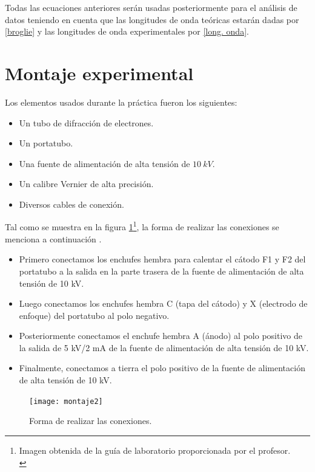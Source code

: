 \documentclass[prb,aps,twocolumn,preprintnumbers,amsmath,amssymb]{revtex4}
\begin{document}
Todas las ecuaciones anteriores serán usadas posteriormente para el análisis de datos teniendo en cuenta que las longitudes de onda teóricas estarán dadas por \eqref{broglie} y las longitudes de onda experimentales por \eqref{long. onda}. 

\section{Montaje experimental}

Los elementos usados durante la práctica fueron los siguientes:

\begin{itemize}
	\item Un tubo de difracción de electrones.
	\item Un portatubo.
	\item Una fuente de alimentación de alta tensión de $10\ kV$.
	\item Un calibre Vernier de alta precisión.
	\item Diversos cables de conexión.
\end{itemize}

Tal como se muestra en la figura \ref{fig: montaje2}\footnote{Imagen obtenida de la guía de laboratorio proporcionada por el profesor.\\}, la forma de realizar las conexiones se menciona a continuación \footnotemark[4].

\begin{itemize}
	\item Primero conectamos los enchufes hembra para calentar el cátodo F1 y F2 del portatubo a la salida en la parte trasera de la	fuente de alimentación de alta tensión de 10 kV. 
	
	\item Luego conectamos los enchufes hembra C (tapa del cátodo) y X
	(electrodo de enfoque) del portatubo al polo negativo. 
	
	\item Posteriormente conectamos el enchufe hembra A (ánodo) al polo positivo de	la salida de 5 kV/2 mA de la fuente de alimentación de
	alta tensión de 10 kV.
	
	\item Finalmente, conectamos a tierra el polo positivo de la fuente
	de alimentación de alta tensión de 10 kV. 
	
\end{itemize}

\begin{figure}[h!]
	\centering
	\texttt{[image: montaje2]}
	\caption{ Forma de realizar las conexiones. }
	\label{fig: montaje2}
\end{figure}
\end{document}
